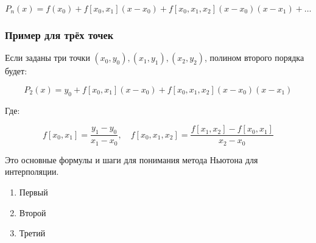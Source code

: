 \documentclass[a4paper,12pt]{article}
\begin{document}
\[
P_n(x) = f(x_0) + f[x_0, x_1](x - x_0) + f[x_0, x_1, x_2](x - x_0)(x - x_1) + \dots
\]

\subsubsection{Пример для трёх точек}

Если заданы три точки \( (x_0, y_0), (x_1, y_1), (x_2, y_2) \), полином второго порядка будет:

\[
P_2(x) = y_0 + f[x_0, x_1](x - x_0) + f[x_0, x_1, x_2](x - x_0)(x - x_1)
\]

Где:

\[
f[x_0, x_1] = \frac{y_1 - y_0}{x_1 - x_0}, \quad f[x_0, x_1, x_2] = \frac{f[x_1, x_2] - f[x_0, x_1]}{x_2 - x_0}
\]

Это основные формулы и шаги для понимания метода Ньютона для интерполяции.
\begin{enumerate}
    \item Первый
    \item Второй
    \item Третий
\end{enumerate}
\end{document}
